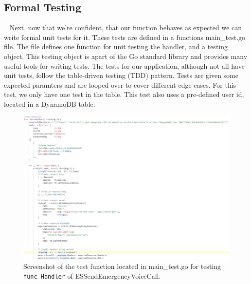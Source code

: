 \documentclass[10pt, a4paper]{article}
\begin{document}
\subsection{Formal Testing}
\par ~ Next, now that we're confident, that our function behaves as expected we can write formal unit tests for it. These tests are defined in a functions main\_test.go file. The file defines one function for unit testing the handler, and a testing object. This testing object is apart of the Go standard library and provides many useful tools for writing tests. The tests for our application, although not all have unit tests, follow the table-driven testing (TDD) pattern. Tests are given some expected paramters and are looped over to cover different edge cases. For this test, we only have one test in the table. This test also uses a pre-defined user id, located in a DynamoDB table.
\begin{figure}[H]
  \includegraphics[scale=.7]{code-screenshots/main-test.PNG}
  \caption{Screenshot of the test function located in main\_test.go for testing \texttt{func Handler} of ESSendEmergencyVoiceCall.}
\end{figure}
\end{document}
